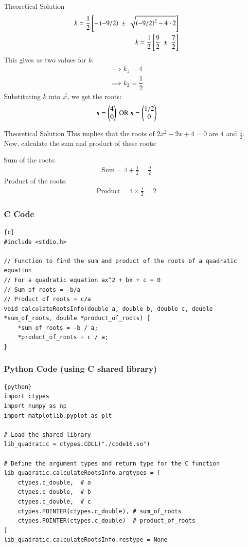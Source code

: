 \documentclass{beamer}
\begin{document}
\begin{frame}{Theoretical Solution}
\begin{align}
    k= \dfrac{1}{2} {}\left[ -\left(-9/2\right) \ \pm \ \sqrt{ \left(-9/2\right)^2 - 4 \cdot 2}\right]\\
    k= \dfrac{1}{2} {}\left[ \dfrac{9}{2} \ \pm \ \dfrac{7}{2}\right]
\end{align}
This gives us two values for $k$:
\begin{align}
    \implies k_1= 4\\
    \implies k_2= \dfrac{1}{2}
\end{align}
Substituting $k$ into $\vec{x}$, we get the roots:
\begin{align}
    \mathbf{x} = \begin{pmatrix}4 \\ 0\end{pmatrix} \text{ OR } \mathbf{x}=\begin{pmatrix}1/2 \\ 0\end{pmatrix}
\end{align}
\end{frame}

\begin{frame}{Theoretical Solution}
This implies that the roots of $2x^2 -9x + 4 =0$ are $4$ and $\frac{1}{2}$.
Now, calculate the sum and product of these roots:

Sum of the roots:
\begin{align}
\text{Sum} = 4 + \frac{1}{2} = \frac{9}{2}
\end{align}
Product of the roots:
\begin{align}
\text{Product} = 4 \times \frac{1}{2} = 2
\end{align}
\end{frame}

\begin{frame}[fragile]
\frametitle{C Code}
\begin{lstlisting}{c}
#include <stdio.h>

// Function to find the sum and product of the roots of a quadratic equation
// For a quadratic equation ax^2 + bx + c = 0
// Sum of roots = -b/a
// Product of roots = c/a
void calculateRootsInfo(double a, double b, double c, double *sum_of_roots, double *product_of_roots) {
    *sum_of_roots = -b / a;
    *product_of_roots = c / a;
}
\end{lstlisting}
\end{frame}

\begin{frame}[fragile]
\frametitle{Python Code (using C shared library)}
\begin{lstlisting}{python}
import ctypes
import numpy as np
import matplotlib.pyplot as plt

# Load the shared library
lib_quadratic = ctypes.CDLL("./code16.so")

# Define the argument types and return type for the C function
lib_quadratic.calculateRootsInfo.argtypes = [
    ctypes.c_double,  # a
    ctypes.c_double,  # b
    ctypes.c_double,  # c
    ctypes.POINTER(ctypes.c_double), # sum_of_roots
    ctypes.POINTER(ctypes.c_double)  # product_of_roots
]
lib_quadratic.calculateRootsInfo.restype = None
\end{lstlisting}
\end{frame}
\end{document}
